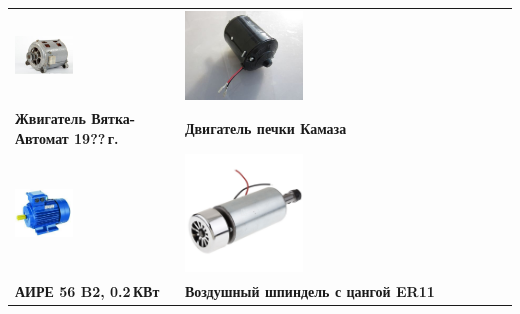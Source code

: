 \begin{tabular}{l l}

\noindent\includegraphics[width=0.37\textwidth]{tech/tools/VyatkaDvig.jpg}
&
\noindent\includegraphics[width=0.37\textwidth]{tech/tools/KamazDvig.jpg}
\\
\textbf{Жвигатель Вятка-Автомат 19??\,г.}
&
\textbf{Двигатель печки Камаза}
\\

\noindent\includegraphics[width=0.37\textwidth]{tech/tools/AIRE.jpg}
&
\noindent\includegraphics[width=0.37\textwidth]{tech/tools/ER11.jpg}
\\
\textbf{АИРЕ 56 B2, 0.2\,КВт}
&
\textbf{Воздушный шпиндель с цангой ER11}
\\

\end{tabular}
\clearpage

